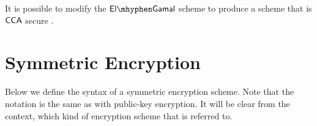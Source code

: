 \begin{comment}
\begin{Algorithm}[]{6cm}
\captionDistinguisher
\caption{$\dist$}
\label{alg:distElgamal}
\begin{algorithmic}[1]
\Require $(\cgroup,\order,\generator,g^x,g^y,g^z)$ 
\State $\pk \defeq (\cgroup,q,g,g^x)$ 
\State $(m_0,m_1)\leftarrow\adve(\pk)$
\State $b'\unileft\{0,1\}$
\State $c_1\defeq g^y$
\State $c_2\defeq g^z\cdot m_b$
\State $c \defeq (c_1,c_2)$
\State $\hat{b'}\leftarrow\adve(c)$
\State \Ret $\askequal{\hat{b'}}{b'}$
\end{algorithmic}
\end{Algorithm}

Since $\DDH$ is hard relative to $\groupgen$ there exists a negligible function $\negl$ such that
\begin{align*}
	\negl(n)\geq \left\vert\prob{\true\leftarrow \dist\left(\cgroup,\order,\generator,g^x,g^y,g^z\right)} - \prob{\true\leftarrow\dist\left(\cgroup,\order,\generator,g^x,g^y,g^{xy}\right)}\right\vert.
\end{align*}
\end{comment}


It is possible to modify the $\elGamal$ scheme to produce a scheme that is $\mathsf{CCA}$ secure \cite{Katz:2007:IMC:1206501}.


\section{Symmetric Encryption}

Below we define the syntax of a symmetric encryption scheme. Note that the notation is the same as with public-key encryption. It will be clear from the context, which kind of encryption scheme that is referred to. 

